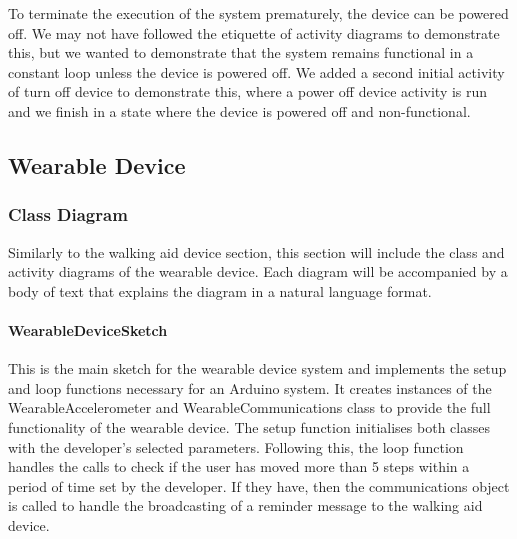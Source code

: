                 To terminate the execution of the system prematurely, the device can be powered off. We may not have followed the etiquette of activity diagrams to demonstrate this, but we wanted to demonstrate that the system remains functional in a constant loop unless the device is powered off. We added a second initial activity of turn off device to demonstrate this, where a power off device activity is run and we finish in a state where the device is powered off and non-functional.

        \subsection{Wearable Device}
        \label{subsec:wearable_device_uml}

            \subsubsection{Class Diagram}
            \label{subsubsec:class_diagram_wearable}

                Similarly to the walking aid device section, this section will include the class and activity diagrams of the wearable device. Each diagram will be accompanied by a body of text that explains the diagram in a natural language format.

                \clearpage
                \thispagestyle{empty}
                \begin{landscape}
                    
                \end{landscape}

                \paragraph{WearableDeviceSketch}\mbox{}

                    This is the main sketch for the wearable device system and implements the setup and loop functions necessary for an Arduino system. It creates instances of the WearableAccelerometer and WearableCommunications class to provide the full functionality of the wearable device. The setup function initialises both classes with the developer's selected parameters. Following this, the loop function handles the calls to check if the user has moved more than 5 steps within a period of time set by the developer. If they have, then the communications object is called to handle the broadcasting of a reminder message to the walking aid device.

